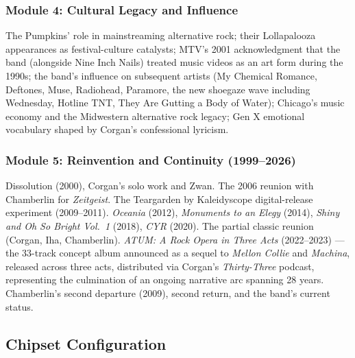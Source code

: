 \documentclass[11pt,letterpaper]{article}
\begin{document}
\subsubsection{Module 4: Cultural Legacy and Influence}

The Pumpkins' role in mainstreaming alternative rock; their Lollapalooza appearances as festival-culture catalysts; MTV's 2001 acknowledgment that the band (alongside Nine Inch Nails) treated music videos as an art form during the 1990s; the band's influence on subsequent artists (My Chemical Romance, Deftones, Muse, Radiohead, Paramore, the new shoegaze wave including Wednesday, Hotline TNT, They Are Gutting a Body of Water); Chicago's music economy and the Midwestern alternative rock legacy; Gen X emotional vocabulary shaped by Corgan's confessional lyricism.

\subsubsection{Module 5: Reinvention and Continuity (1999--2026)}

Dissolution (2000), Corgan's solo work and Zwan. The 2006 reunion with Chamberlin for \textit{Zeitgeist}. The Teargarden by Kaleidyscope digital-release experiment (2009--2011). \textit{Oceania} (2012), \textit{Monuments to an Elegy} (2014), \textit{Shiny and Oh So Bright Vol.\ 1} (2018), \textit{CYR} (2020). The partial classic reunion (Corgan, Iha, Chamberlin). \textit{ATUM: A Rock Opera in Three Acts} (2022--2023) --- the 33-track concept album announced as a sequel to \textit{Mellon Collie} and \textit{Machina}, released across three acts, distributed via Corgan's \textit{Thirty-Three} podcast, representing the culmination of an ongoing narrative arc spanning 28 years. Chamberlin's second departure (2009), second return, and the band's current status.

\subsection{Chipset Configuration}
\end{document}
